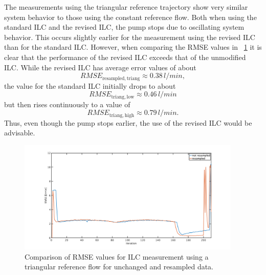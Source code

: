 The measurements using the triangular reference trajectory show very similar system behavior to those using the constant reference flow.
Both when using the standard ILC and the revised ILC, the pump stops due to oscillating system behavior. This occurs slightly earlier for the measurement using the revised ILC than for the standard ILC. However, when comparing the RMSE values in \figurename~\ref{fig:RMSE_ilc_var_dist_comp_triang} it is clear that the performance of the revised ILC exceeds that of the unmodified ILC. While the revised ILC has average error values of about
\begin{equation}
  RMSE_{\mathrm{resampled,triang}}\approx0.38\,l/min,
\end{equation}
the value for the standard ILC initially drops to about
\begin{equation}
  RMSE_{\mathrm{triang,low}}\approx0.46\,l/min
\end{equation}
but then rises continuously to a value of
\begin{equation}
  RMSE_{\mathrm{triang,high}}\approx0.79\,l/min.
\end{equation}
Thus, even though the pump stops earlier, the use of the revised ILC would be advisable.

\begin{figure}[ht!]
  \centering
  \includegraphics[width=0.95\textwidth]{images/chapt_5/ILC/RMSE_ilc_var_dist_comp_triang.pdf}
  \caption[Comparison of RMSE values for ILC measurement using a triangular reference flow for unchanged and resampled data]{Comparison of RMSE values for ILC measurement using a triangular reference flow for unchanged and resampled data.}
  \label{fig:RMSE_ilc_var_dist_comp_triang}
\end{figure}


